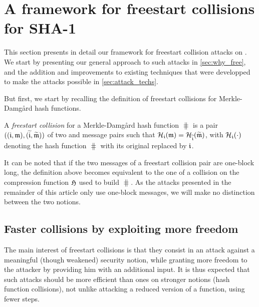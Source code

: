 \section{A framework for freestart collisions for SHA-1}

This section presents in detail our framework for freestart collision attacks on \shaone. We start by presenting our general approach to such attacks
in \autoref{sec:why_free}, and the addition and improvements to existing techniques that were developped to make the attacks possible in \autoref{sec:attack_techs}.

But first, we start by recalling the definition of freestart collisions for Merkle-Damg\aa rd hash functions.

\begin{defi}
A \emph{freestart collision} for a Merkle-Damg\aa rd hash function $\hash$ is a pair $((\mathfrak{i},\mathfrak{m}), (\widetilde{\mathfrak{i}},\widetilde{\mathfrak{m}}))$
of two \iv and message pairs such that $\operatorname{\mathcal{H}}_{\mathfrak{i}}(\mathfrak{m}) = \operatorname{\mathcal{H}}_{\widetilde{\mathfrak{i}}}(\widetilde{\mathfrak{m}})$, with $\operatorname{\mathcal{H}}_{\mathfrak{i}}(\cdot)$ denoting
the hash function $\hash$ with its original \iv replaced by $\mathfrak{i}$.
\end{defi}

It can be noted that if the two messages of a freestart collision pair are one-block long, the definition above becomes equivalent to the one of a collision
on the compression function $\operatorname{\mathfrak{H}}$ used to build $\hash$. As the attacks presented in the remainder of this article only use one-block messages, we
will make no distinction between the two notions. 


\subsection{Faster collisions by exploiting more freedom}
\label{sec:why_free}

The main interest of freestart collisions is that they consist in an attack against a meaningful (though weakened) security notion, while granting more freedom to
the attacker by providing him with an additional input. It is thus expected that such attacks should be more efficient than ones on stronger notions (\eg hash function
collisions), not unlike attacking a reduced version of a function, using fewer steps.

